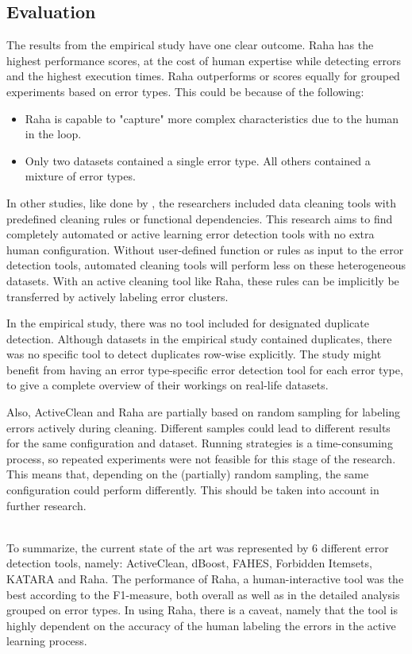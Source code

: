 \subsection{Evaluation}
\label{subsec:evaluation_empirical_study_results}
The results from the empirical study have one clear outcome. Raha has the highest performance scores, at the cost of human expertise while detecting errors and the highest execution times. 
Raha outperforms or scores equally for grouped experiments based on error types. This could be because of the following:
\begin{itemize}
    \item Raha is capable to "capture" more complex characteristics due to the human in the loop.
    \item Only two datasets contained a single error type. All others contained a mixture of error types.
\end{itemize}

In other studies, like done by \cite{Abedjan2016-jc}, the researchers included data cleaning tools with predefined cleaning rules or functional dependencies. This research aims to find completely automated or active learning error detection tools with no extra human configuration. Without user-defined function or rules as input to the error detection tools, automated cleaning tools will perform less on these heterogeneous datasets. With an active cleaning tool like Raha, these rules can be implicitly be transferred by actively labeling error clusters.

In the empirical study, there was no tool included for designated duplicate detection. Although datasets in the empirical study contained duplicates, there was no specific tool to detect duplicates row-wise explicitly. The study might benefit from having an error type-specific error detection tool for each error type, to give a complete overview of their workings on real-life datasets.

Also, ActiveClean and Raha are partially based on random sampling for labeling errors actively during cleaning. Different samples could lead to different results for the same configuration and dataset. Running strategies is a time-consuming process, so repeated experiments were not feasible for this stage of the research. This means that, depending on the (partially) random sampling, the same configuration could perform differently. This should be taken into account in further research. 

~\\To summarize, the current state of the art was represented by 6 different error detection tools, namely: ActiveClean, dBoost, FAHES, Forbidden Itemsets, KATARA and Raha. The performance of Raha, a human-interactive tool was the best according to the F1-measure, both overall as well as in the detailed analysis grouped on error types. In using Raha, there is a caveat, namely that the tool is highly dependent on the accuracy of the human labeling the errors in the active learning process. 